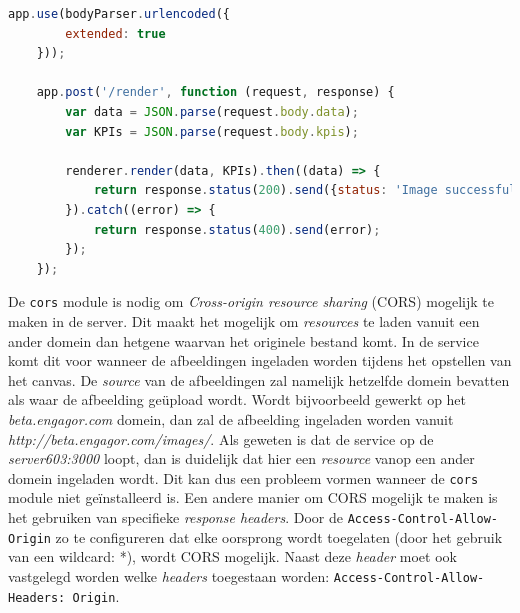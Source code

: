 \begin{lstlisting}[caption={index.js - Node.js server},label=lst:ExpressIndexServer,language=javascript]
	app.use(bodyParser.urlencoded({
		extended: true
	}));
	
	app.post('/render', function (request, response) {
		var data = JSON.parse(request.body.data);
		var KPIs = JSON.parse(request.body.kpis);
		
		renderer.render(data, KPIs).then((data) => {
			return response.status(200).send({status: 'Image successfully generated', image: 	data.toString('base64')});
		}).catch((error) => {
			return response.status(400).send(error);
		});
	});
\end{lstlisting}

De \texttt{cors} module is nodig om \textit{Cross-origin resource sharing} (CORS) mogelijk te maken in de server. Dit maakt het mogelijk om \textit{resources} te laden vanuit een ander domein dan hetgene waarvan het originele bestand komt. In de service komt dit voor wanneer de afbeeldingen ingeladen worden tijdens het opstellen van het canvas. De \textit{source} van de afbeeldingen zal namelijk hetzelfde domein bevatten als waar de afbeelding ge\"{u}pload wordt. Wordt bijvoorbeeld gewerkt op het \textit{beta.engagor.com} domein, dan zal de afbeelding ingeladen worden vanuit \textit{http://beta.engagor.com/images/}. Als geweten is dat de service op de \textit{server603:3000} loopt, dan is duidelijk dat hier een \textit{resource} vanop een ander domein ingeladen wordt. Dit kan dus een probleem vormen wanneer de \texttt{cors} module niet ge\"{i}nstalleerd is. %
Een andere manier om CORS mogelijk te maken is het gebruiken van specifieke \textit{response headers}. Door de \texttt{Access-Control-Allow-Origin} zo te configureren dat elke oorsprong wordt toegelaten (door het gebruik van een wildcard: *), wordt CORS mogelijk. Naast deze \textit{header} moet ook vastgelegd worden welke \textit{headers} toegestaan worden: \texttt{Access-Control-Allow-Headers: Origin}. %




